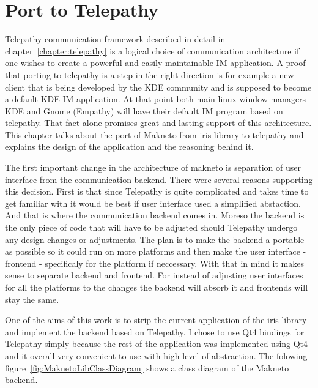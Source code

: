 
\chapter{Port to Telepathy}
Telepathy communication framework described in detail in chapter~\ref{chapter:telepathy} is a logical choice of communication architecture if one wishes to create a powerful and easily maintainable IM application. A proof that porting to telepathy is a step in the right direction is for example a new client that is being developed by the KDE community and is supposed to become a default KDE IM application. At that point both main linux window managers KDE and Gnome (Empathy) will have their default IM program based on telepathy. That fact alone promises great and lasting support of this architecture. This chapter talks about the port of Makneto from iris library to telepathy and explains the design of the application and the reasoning behind it.

The first important change in the architecture of makneto is separation of user interface from the communication backend. There were several reasons supporting this decision. First is that since Telepathy is quite complicated and takes time to get familiar with it would be best if user interface used a simplified abstaction. And that is where the communication backend comes in. Moreso the backend is the only piece of code that will have to be adjusted should Telepathy undergo any design changes or adjustments. The plan is to make the backend a portable as possible so it could run on more platforms and then make the user interface - frontend - specificaly for the platform if neccessary. With that in mind it makes sense to separate backend and frontend. For instead of adjusting user interfaces for all the platforms to the changes the backend will absorb it and frontends will stay the same. 

One of the aims of this work is to strip the current application of the iris library and implement the backend based on Telepathy. I chose to use Qt4 bindings for Telepathy simply because the rest of the application was implemented using Qt4 and it overall very convenient to use with high level of abstraction.	The folowing figure~\ref{fig:MaknetoLibClassDiagram} shows a class diagram of the Makneto backend. 


